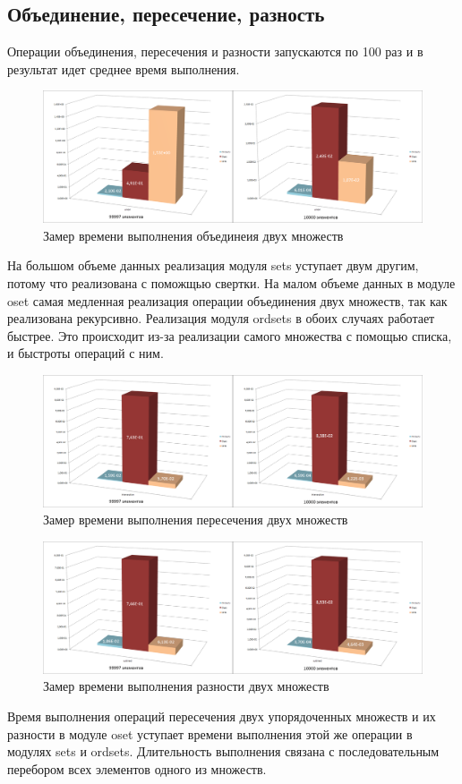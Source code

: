 	\subsection{Объединение, пересечение, разность}
		Операции объединения, пересечения и разности запускаются по 100 раз и в результат 
		идет среднее время выполнения.
		
		\begin{figure}[H]
				\centering
				\includegraphics[width=\textwidth]{img/histograms/union.png}
				\caption{Замер времени выполнения объединеия двух множеств}
		\end{figure}
		На большом объеме данных реализация модуля sets уступает двум другим, потому что реализована с поможщью свертки.
		На малом объеме данных в модуле oset самая медленная реализация операции объединения двух множеств, так как
		реализована рекурсивно. Реализация модуля ordsets в обоих случаях работает быстрее. Это происходит из-за 
		реализации самого множества с помощью списка, и быстроты операций с ним.
		
		\begin{figure}[H]
				\centering
				\includegraphics[width=\textwidth]{img/histograms/intersection.png}
				\caption{Замер времени выполнения пересечения двух множеств}
		\end{figure}
		
		\begin{figure}[H]
				\centering
				\includegraphics[width=\textwidth]{img/histograms/subtract.png}
				\caption{Замер времени выполнения разности двух множеств}
		\end{figure}
		Время выполнения операций пересечения двух упорядоченных множеств и их разности в модуле oset уступает времени
		выполнения этой	же операции в модулях sets и ordsets. Длительность выполнения связана с последовательным перебором
		всех элементов одного из множеств.
		

